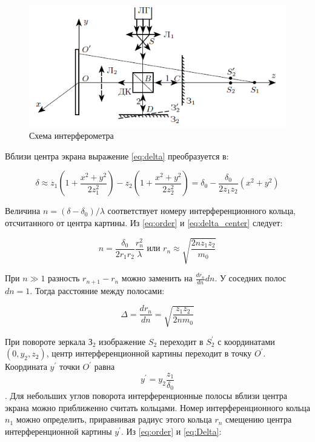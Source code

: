 \documentclass[a4paper,12pt]{article}
\begin{document}
	\begin{figure}[h!]\label{fig:inter}
		\begin{center}
			\includegraphics[width = \linewidth]{inter}
			\caption{Схема интерферометра}
		\end{center}
	\end{figure}
	
	Вблизи центра экрана выражение \eqref{eq:delta} преобразуется в:
	
	\begin{equation}\label{eq:delta_center}
	\delta \approx z_1\left(1+\frac{x^2+y^2}{2z_1^2}\right) - z_2\left(1+\frac{x^2+y^2}{2z_2^2}\right) = \delta_0 - \frac{\delta_0}{2z_1z_2}(x^2+y^2)
	\end{equation}
	
	Величина $n = (\delta - \delta_0)/\lambda$ соответствует номеру интерференционного кольца, отсчитанного от центра картины. Из \eqref{eq:order} и \eqref{eq:delta_center} следует:
	
	\begin{equation}\label{eq:rn}
	n = \frac{\delta_0}{2r_1r_2}\frac{r_n^2}{\lambda} \text{ или } r_n \approx \sqrt{\frac{2nz_1z_2}{m_0}} 
	\end{equation}
	
	При $n \gg 1$ разность $r_{n+1} - r_n$ можно заменить на $\frac{dr_n}{dn}dn$. У соседних полос $dn = 1$. Тогда расстояние между полосами:
	
	\begin{equation}\label{eq:Delta}
	\Delta = \frac{dr_n}{dn} = \sqrt{\frac{z_1z_2}{2nm_0}}
	\end{equation}
	
	При повороте зеркала $\text{З}_2$ изображение $S_2$ переходит в $S_2^{'}$ с координатами $(0, y_2, z_2)$, центр интерференционной картины переходит в точку $O^{'}$. Координата $y^{'}$ точки $O^{'}$ равна \[y^{'} = y_2\frac{z_1}{\delta_0}\].
	Для небольших углов поворота интерференционные полосы вблизи центра экрана можно приближенно считать кольцами. Номер интерференционного кольца $n_1$ можно определить, приравнивая радиус этого кольца $r_n$ смещению центра интерференционной картины $y^{'}$. Из \eqref{eq:order} и \eqref{eq:Delta}:
	
\end{document}
